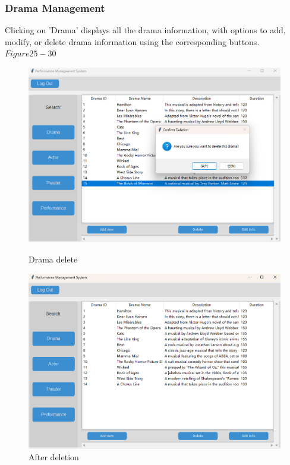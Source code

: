 \documentclass[12pt]{article}
\begin{document}
\subsubsection{Drama Management}
\par Clicking on 'Drama' displays all the drama information, with options to add, modify, or delete drama information using the corresponding buttons.\(Figure25-30\)
\begin{figure}[H]
    \centering
    \begin{minipage}{0.48\textwidth}
        \centering
        \includegraphics[width=\textwidth]{25.png}
        \caption{Drama delete} 
        \label{Figure 25}
    \end{minipage}
    \hfill
    \begin{minipage}{0.48\textwidth}
        \centering
        \includegraphics[width=\textwidth]{26.png}
        \caption{After deletion}
        \label{Figure 26}
    \end{minipage}
\end{figure}
\end{document}
